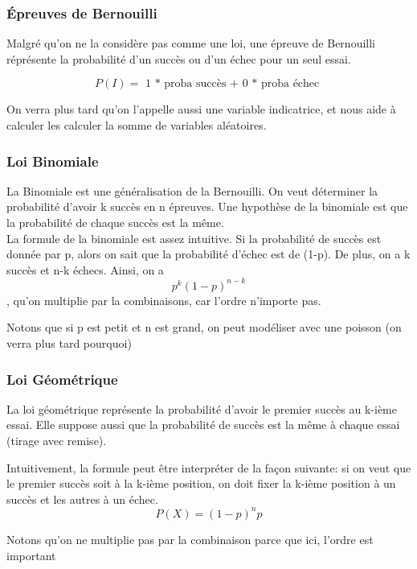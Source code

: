 \documentclass{article}
\begin{document}
\subsubsection{Épreuves de Bernouilli}%
\label{ssub:Épreuves de Bernouilli}

Malgré qu'on ne la considère pas comme une loi, une épreuve de Bernouilli
réprésente la probabilité d'un succès ou d'un échec pour un seul essai.

$$ P(I) = \text{ 1 * proba succès + 0 * proba échec } $$

On verra plus tard qu'on l'appelle aussi une variable indicatrice, et nous
aide à calculer les calculer la somme de variables aléatoires.

\subsubsection{Loi Binomiale}%
\label{ssub:Loi Binomiale}

La Binomiale est une généralisation de la Bernouilli. On veut déterminer
la probabilité d'avoir k succès en n épreuves. Une hypothèse de la binomiale
est que la probabilité de chaque succès est la même.\\

La formule de la binomiale est assez intuitive. Si la probabilité de succès
est donnée par p, alors on sait que la probabilité d'échec est de (1-p).
De plus, on a k succès et n-k échecs. Ainsi, on a
$$ p^k (1-p)^{n-k} $$, qu'on multiplie par la combinaisons, car l'ordre
n'importe pas.

Notons que si p est petit et n est grand, on peut modéliser avec une poisson
(on verra plus tard pourquoi)

\subsubsection{Loi Géométrique}%
\label{ssub:Loi Géométrique}

La loi géométrique représente la probabilité d'avoir le premier succès au
k-ième essai. Elle suppose aussi que la probabilité de succès est la
même à chaque essai (tirage avec remise).

Intuitivement, la formule peut être interpréter de la façon suivante:
si on veut que le premier succès soit à la k-ième position, on doit
fixer la k-ième position à un succès et les autres à un échec.
$$ P(X) = (1-p)^n p $$

Notons qu'on ne multiplie pas par la combinaison parce que ici, l'ordre
est important
\end{document}
